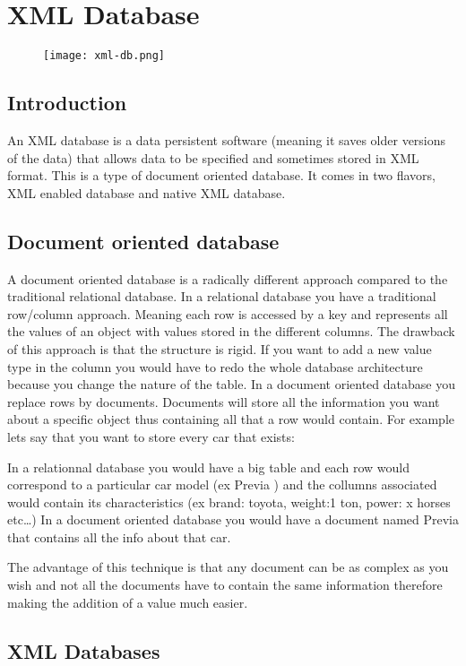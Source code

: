 

\chapter{XML Database}
\begin{figure}[!t]
\texttt{[image: xml-db.png]}
\end{figure}
\section{Introduction}
An XML database is a data persistent software (meaning it saves older versions of the data) that allows data to be specified and sometimes stored in XML format. This is a type of document oriented database. It comes in two flavors, XML enabled database and native XML database.
\section{Document oriented database}

A document oriented database is a radically different approach compared to the traditional relational database. In a relational database you have a traditional row/column approach. Meaning each row is accessed by a key and represents all the values of an object with values stored in the different columns. The drawback of this approach is that the structure is rigid. If you want to add a new value type in the column you would have to redo the whole database architecture because you change the nature of the table. In a document oriented database you replace rows by documents. Documents will store all the information you want about a specific object thus containing all that a row would contain. For example lets say that you want to store every car that exists:

    In a relationnal database you would have a big table and each row would correspond to a particular car model (ex Previa ) and the collumns associated would contain its characteristics (ex brand: toyota, weight:1 ton, power: x horses etc…)
    In a document oriented database you would have a document named Previa that contains all the info about that car.

The advantage of this technique is that any document can be as complex as you wish and not all the documents have to contain the same information therefore making the addition of a value much easier.
\section{XML Databases}
